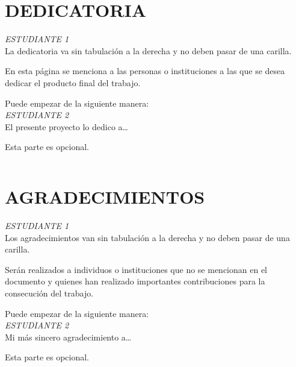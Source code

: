 \chapter*{DEDICATORIA}
\thispagestyle{empty}
\begin{flushright}
    \begin{minipage}{.45\linewidth}
        \textit{ESTUDIANTE 1}\\
        La dedicatoria va sin tabulaci\'on a la derecha y no deben pasar de una carilla. 
        
        En esta p\'agina se menciona a las personas o instituciones a las que se desea dedicar el producto final del trabajo.
        
        Puede empezar de la siguiente manera:
        \\[3.0em]
        
        \textit{ESTUDIANTE 2}\\
        El presente proyecto lo dedico a…
        
        Esta parte es opcional.
    \end{minipage}
\end{flushright}
\newpage
$\ $
\thispagestyle{empty}


\chapter*{AGRADECIMIENTOS}
\thispagestyle{empty}
\begin{flushright}
    \begin{minipage}{.45\linewidth}
        \textit{ESTUDIANTE 1}\\
        Los agradecimientos van sin tabulaci\'on a la derecha y no deben pasar de una carilla.
        
        Ser\'an realizados a individuos o instituciones que no se mencionan en el documento y quienes han realizado importantes contribuciones para la consecución del trabajo.
        
        Puede empezar de la siguiente manera:
        \\[3.0em]
        
        \textit{ESTUDIANTE 2}\\
        Mi m\'as sincero agradecimiento a…
        
        Esta parte es opcional.
    \end{minipage}
\end{flushright}
\newpage
$\ $
\thispagestyle{empty}


